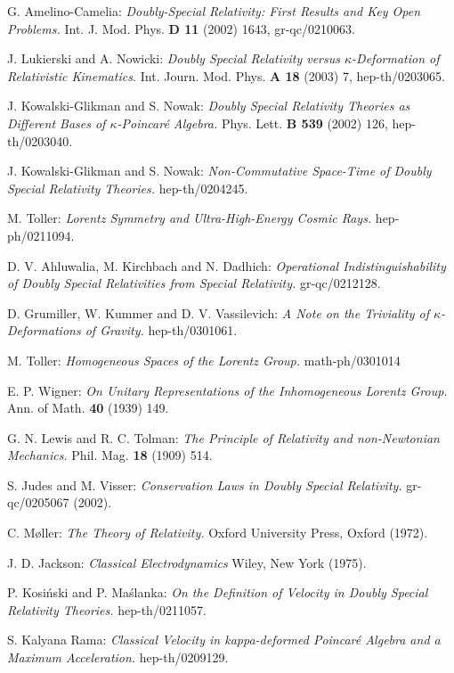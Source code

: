 \documentclass[a4paper,12pt]{article}
\begin{document}
\begin{thebibliography}{999}
 G. Amelino-Camelia:
{\it Doubly-Special Relativity: First Results and Key Open Problems.}
Int. J. Mod. Phys. {\bf D 11} (2002) 1643, gr-qc/0210063.

 J. Lukierski and A. Nowicki:
{\it Doubly Special Relativity versus $\kappa$-Deformation of Relativistic Kinematics.}
Int. Journ. Mod. Phys. {\bf A 18} (2003) 7, hep-th/0203065.

 J. Kowalski-Glikman and S. Nowak:
{\it Doubly Special Relativity Theories as Different Bases of $\kappa$-Poincar\'e Algebra.}
Phys. Lett. {\bf B 539} (2002) 126, hep-th/0203040.

 J. Kowalski-Glikman and S. Nowak:
{\it Non-Commutative Space-Time of Doubly Special Relativity Theories.}
hep-th/0204245.

 M. Toller:
{\it Lorentz Symmetry and Ultra-High-Energy Cosmic Rays.}
hep-ph/0211094.

 D. V. Ahluwalia, M. Kirchbach and N. Dadhich:
{\it Operational Indistinguishability of Doubly Special Relativities from Special Relativity.}
gr-qc/0212128.

 D. Grumiller, W. Kummer and D. V. Vassilevich:
{\it A Note on the Triviality of $\kappa$-Deformations of Gravity.}
hep-th/0301061.

 M. Toller:
{\it Homogeneous Spaces of the Lorentz Group.}
math-ph/0301014

  E. P. Wigner:
{\it On Unitary Representations of the Inhomogeneous Lorentz Group.}
Ann. of Math. {\bf 40} (1939) 149.

 G. N. Lewis and R. C. Tolman:
{\it The Principle of Relativity and non-Newtonian Mechanics.}
Phil. Mag. {\bf 18} (1909) 514.

  S. Judes and M. Visser:
{\it Conservation Laws in Doubly Special Relativity.}
gr-qc/0205067 (2002).

 C. M\o ller:
{\it The Theory of Relativity.}
Oxford University Press, Oxford (1972).

 J. D. Jackson:
{\it Classical Electrodynamics}
Wiley, New York (1975).

 P. Kosi\'nski and P. Ma\'slanka:
{\it On the Definition of Velocity in Doubly Special Relativity Theories.}
hep-th/0211057.

 S. Kalyana Rama:
{\it Classical Velocity in kappa-deformed Poincar\'e Algebra and a Maximum Acceleration.}
hep-th/0209129.


\end{thebibliography}
\end{document}
